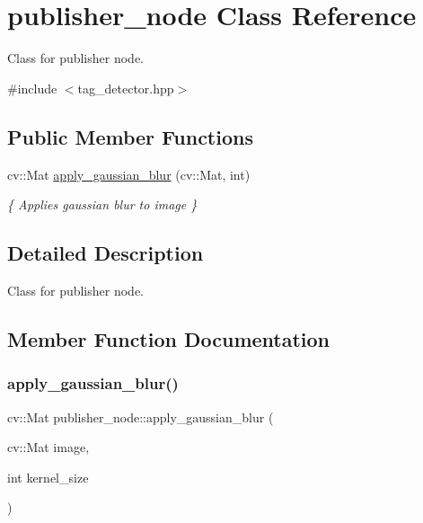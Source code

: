 \hypertarget{classpublisher__node}{}\section{publisher\+\_\+node Class Reference}
\label{classpublisher__node}


Class for publisher node.  




{\ttfamily \#include $<$tag\+\_\+detector.\+hpp$>$}

\subsection*{Public Member Functions}
\begin{DoxyCompactItemize}
\item 
cv\+::\+Mat \hyperlink{classpublisher__node_aa552b6a40fedbf5cee874624a0702d33}{apply\+\_\+gaussian\+\_\+blur} (cv\+::\+Mat, int)
\begin{DoxyCompactList}\small\item\em \{ Applies gaussian blur to image \} \end{DoxyCompactList}\end{DoxyCompactItemize}


\subsection{Detailed Description}
Class for publisher node. 

\subsection{Member Function Documentation}
\mbox{\label{classpublisher__node_aa552b6a40fedbf5cee874624a0702d33}} 
\subsubsection{\texorpdfstring{apply\+\_\+gaussian\+\_\+blur()}{apply\_gaussian\_blur()}}
{\footnotesize\ttfamily cv\+::\+Mat publisher\+\_\+node\+::apply\+\_\+gaussian\+\_\+blur (\begin{DoxyParamCaption}\item[{cv\+::\+Mat}]{image,  }\item[{int}]{kernel\+\_\+size }\end{DoxyParamCaption})}



